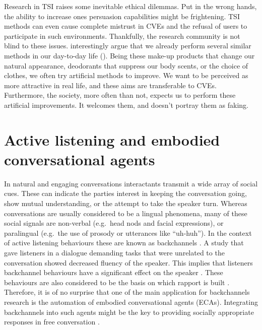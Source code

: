 \documentclass[]{simple-thesis}
\begin{document}
Research in TSI raises some inevitable ethical dilemmas.
Put in the wrong hands, the ability to increase ones persuasion capabilities might be frightening.
TSI methods can even cause complete mistrust in CVEs and the refusal of users to participate in such environments.
Thankfully, the research community is not blind to these issues.
\citeauthor{Bailenson2008} interestingly argue that we already perform several similar methods in our day-to-day life (\citeyear{Bailenson2008}).
Being these make-up products that change our natural appearance, deodorants that suppress our body scents, or the choice of clothes, we often try artificial methods to improve.
We want to be perceived as more attractive in real life, and these aims are transferable to CVEs.
Furthermore, the society, more often than not, expects us to perform these artificial improvements.
It welcomes them, and doesn't portray them as faking.

\section{Active listening and embodied conversational agents}

In natural and engaging conversations interactants transmit a wide array of social cues.
These can indicate the parties interest in keeping the conversation going, show mutual understanding, or the attempt to take the speaker turn.
Whereas conversations are usually considered to be a lingual phenomena, many of these social signals are non-verbal (e.g.\ head nods and facial expressions), or paralingual (e.g.\ the use of prosody or utterances like ``uh-huh'').
In the context of active listening behaviours these are known as backchannels \citep{Yngve1970}.
A study that gave listeners in a dialogue demanding tasks that were unrelated to the conversation showed decreased fluency of the speaker.
This implies that listeners backchannel behaviours have a significant effect on the speaker \citep{Bavelas2000}.
These behaviours are also considered to be the basis on which rapport is built \citep{Tickle-Degnen1990, Gratch2007}.
Therefore, it is of no surprise that one of the main application for backchannels research is the automation of embodied conversational agents (ECAs).
Integrating backchannels into such agents might be the key to providing socially appropriate responses in free conversation \citep{Morency2008, Bevacqua2008}.
\end{document}
